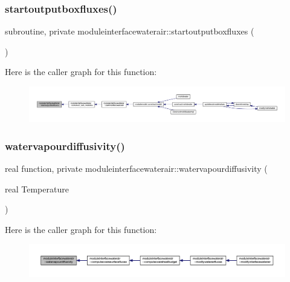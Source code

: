 \subsubsection{\texorpdfstring{startoutputboxfluxes()}{startoutputboxfluxes()}}
{\footnotesize\ttfamily subroutine, private moduleinterfacewaterair\+::startoutputboxfluxes (\begin{DoxyParamCaption}{ }\end{DoxyParamCaption})\hspace{0.3cm}{\ttfamily [private]}}

Here is the caller graph for this function\+:\nopagebreak
\begin{figure}[H]
\begin{center}
\leavevmode
\includegraphics[width=350pt]{namespacemoduleinterfacewaterair_a657983e875ad047622b576288b98dd2e_icgraph}
\end{center}
\end{figure}
\mbox{\label{namespacemoduleinterfacewaterair_ad635dbe2d03621ece4e4eeb32fc65bb6}} 
\subsubsection{\texorpdfstring{watervapourdiffusivity()}{watervapourdiffusivity()}}
{\footnotesize\ttfamily real function, private moduleinterfacewaterair\+::watervapourdiffusivity (\begin{DoxyParamCaption}\item[{real}]{Temperature }\end{DoxyParamCaption})\hspace{0.3cm}{\ttfamily [private]}}

Here is the caller graph for this function\+:\nopagebreak
\begin{figure}[H]
\begin{center}
\leavevmode
\includegraphics[width=350pt]{namespacemoduleinterfacewaterair_ad635dbe2d03621ece4e4eeb32fc65bb6_icgraph}
\end{center}
\end{figure}


